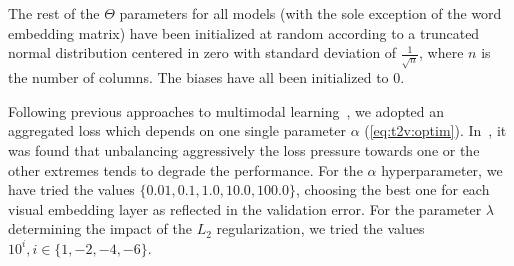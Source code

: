 The rest of the $\Theta$ parameters for all models (with the sole exception of the word embedding matrix) have been initialized at random according to a truncated normal distribution centered in zero with standard deviation of $\frac{1}{\sqrt{n}}$, where $n$ is the number of columns.
The biases have all been initialized to 0.

Following previous approaches to multimodal learning~\cite{feng2014cross,ngiam2011multimodal}, we adopted an aggregated loss which depends on one single parameter $\alpha$ (\ref{eq:t2v:optim}).
In~\cite{feng2014cross}, it was found that unbalancing aggressively the loss pressure towards one or the other extremes tends to degrade the performance.
For the $\alpha$ hyperparameter, we have tried the values $\{0.01, 0.1, 1.0, 10.0, 100.0\}$, choosing the best one for each visual embedding layer as reflected in the validation error.
For the parameter $\lambda$ determining the impact of the $L_2$ regularization, we tried the values $10^i, i\in\{1,-2,-4,-6\}$.


